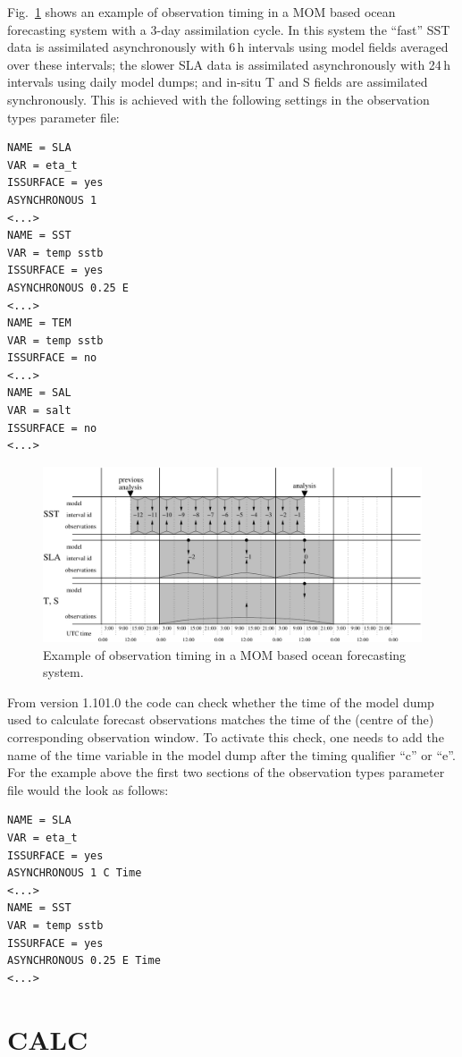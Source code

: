 \documentclass[11pt]{report}
\begin{document}
Fig.~\ref{fig:mom_timing} shows an example of observation timing in a MOM based ocean forecasting system with a 3-day assimilation cycle.
In this system the ``fast'' SST data is assimilated asynchronously with 6\,h intervals using model fields averaged over these intervals; the slower SLA data is assimilated asynchronously with 24\,h intervals using daily model dumps; and in-situ T and S fields are assimilated synchronously.
This is achieved with the following settings in the observation types parameter file:
\begin{Verbatim}[frame=single,fontsize=\footnotesize]
NAME = SLA
VAR = eta_t
ISSURFACE = yes
ASYNCHRONOUS 1
<...>
NAME = SST
VAR = temp sstb
ISSURFACE = yes
ASYNCHRONOUS 0.25 E
<...>
NAME = TEM
VAR = temp sstb
ISSURFACE = no
<...>
NAME = SAL
VAR = salt
ISSURFACE = no
<...>
\end{Verbatim}
\begin{figure}[h]
  \centering
  \includegraphics[width = \textwidth]{plots/obstiming_example.pdf}
  \caption{Example of observation timing in a MOM based ocean forecasting system.}
  \label{fig:mom_timing}
\end{figure}

From version 1.101.0 the code can check whether the time of the model dump used to calculate forecast observations matches the time of the (centre of the) corresponding observation window.
To activate this check, one needs to add the name of the time variable in the model dump after the timing qualifier ``c'' or ``e''.
For the example above the first two sections of the observation types parameter file would the look as follows:
\begin{Verbatim}[frame=single,fontsize=\footnotesize]
NAME = SLA
VAR = eta_t
ISSURFACE = yes
ASYNCHRONOUS 1 C Time
<...>
NAME = SST
VAR = temp sstb
ISSURFACE = yes
ASYNCHRONOUS 0.25 E Time
<...>
\end{Verbatim}

\section{CALC}
\end{document}
